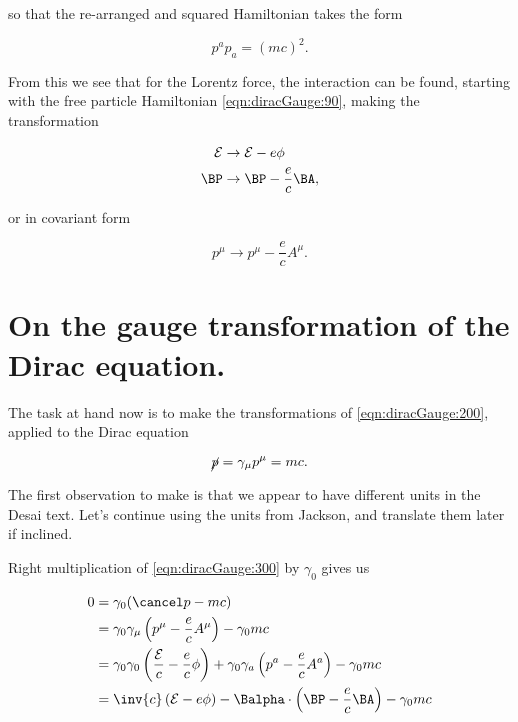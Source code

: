 so that the re-arranged and squared Hamiltonian takes the form

\begin{equation}\label{eqn:diracGauge:190}
p^a p_a = (m c)^2.
\end{equation}

From this we see that for the Lorentz force, the interaction can be found, starting with the free particle Hamiltonian \ref{eqn:diracGauge:90}, making the transformation

\begin{subequations}
\label{eqn:diracGauge:200}
\begin{align}
\mathcal{E}   &\rightarrow \mathcal{E} - e\phi \\
\BP &\rightarrow \BP - \frac{e}{c}\BA,
\end{align}
\end{subequations}

or in covariant form

\begin{equation}\label{eqn:diracGauge:210}
p^\mu \rightarrow p^\mu - \frac{e}{c}A^\mu.
\end{equation}

\section{On the gauge transformation of the Dirac equation.}

The task at hand now is to make the transformations of \ref{eqn:diracGauge:200}, applied to the Dirac equation

\begin{equation}\label{eqn:diracGauge:300}
\cancel{p} = \gamma_\mu p^\mu = m c.
\end{equation}

The first observation to make is that we appear to have different units in the Desai text.  Let's continue using the units from Jackson, and translate them later if inclined.

Right multiplication of \ref{eqn:diracGauge:300} by $\gamma_0$ gives us

\begin{align*}
0 &= \gamma_0 (\pslash - m c) \\
  &= \gamma_0 \gamma_\mu \left( p^\mu - \frac{e}{c} A^\mu \right)
- \gamma_0 m c
\\
  &=
\gamma_0 \gamma_0 \left(\frac{\mathcal{E}}{c} - \frac{e}{c} \phi \right)
+\gamma_0 \gamma_a \left(p^a - \frac{e}{c} A^a \right)
- \gamma_0 m c \\
  &=
\inv{c} \left( \mathcal{E}- e \phi \right)
-\Balpha \cdot \left(\BP - \frac{e}{c} \BA \right)
- \gamma_0 m c \\
\end{align*}

